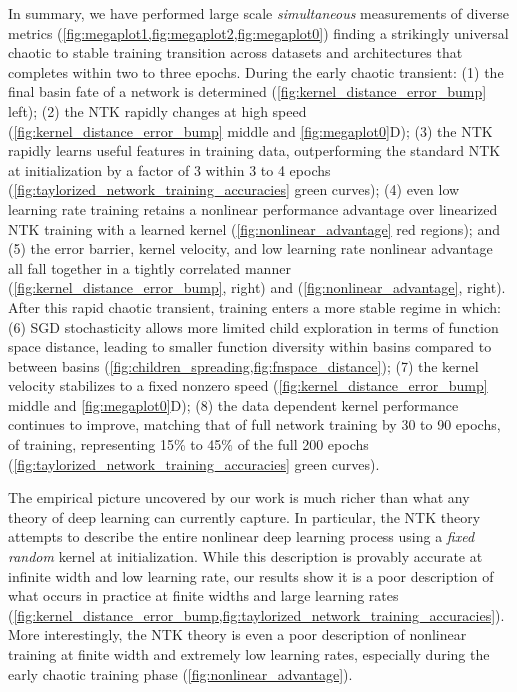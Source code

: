\documentclass{article}
\begin{document}
In summary, we have performed large scale {\it simultaneous} measurements of diverse metrics (\cref{fig:megaplot1,fig:megaplot2,fig:megaplot0}) finding a strikingly universal chaotic to stable training transition across datasets and architectures that completes within two to three epochs. During the early chaotic transient: (1) the final basin fate of a network is determined (\cref{fig:kernel_distance_error_bump} left); (2) the NTK rapidly changes at high speed (\cref{fig:kernel_distance_error_bump} middle and \cref{fig:megaplot0}D); (3) the NTK rapidly learns useful features in training data, outperforming the standard NTK at initialization by a factor of 3 within 3 to 4 epochs (\cref{fig:taylorized_network_training_accuracies} green curves); (4) even low learning rate training retains a nonlinear performance advantage over linearized NTK training with a learned kernel (\cref{fig:nonlinear_advantage} red regions); and (5) the error barrier, kernel velocity, and low learning rate nonlinear advantage all fall together in a tightly correlated manner (\cref{fig:kernel_distance_error_bump}, right) and (\cref{fig:nonlinear_advantage}, right).  After this rapid chaotic transient, training enters a more stable regime in which: (6) SGD stochasticity allows more limited child exploration in terms of function space distance, leading to smaller function diversity within basins compared to between basins (\cref{fig:children_spreading,fig:fnspace_distance}); (7) the kernel velocity stabilizes to a fixed nonzero speed (\cref{fig:kernel_distance_error_bump} middle and \cref{fig:megaplot0}D); (8) the data dependent kernel performance continues to improve, matching that of full network training by 30 to 90 epochs, of training, representing 15\% to 45\% of the full 200 epochs (\cref{fig:taylorized_network_training_accuracies} green curves). 

The empirical picture uncovered by our work is much richer than what any theory of deep learning can currently capture. In particular, the NTK theory attempts to describe the entire  nonlinear deep learning process using a {\it fixed random} kernel at initialization. While this description is provably accurate at infinite width and low learning rate, our results show it is a poor description of what occurs in practice at finite widths and large learning rates (\cref{fig:kernel_distance_error_bump,fig:taylorized_network_training_accuracies}). More interestingly, the NTK theory is even a poor description of nonlinear training at finite width and extremely low learning rates, especially during the early chaotic training phase (\cref{fig:nonlinear_advantage}). 
\end{document}
